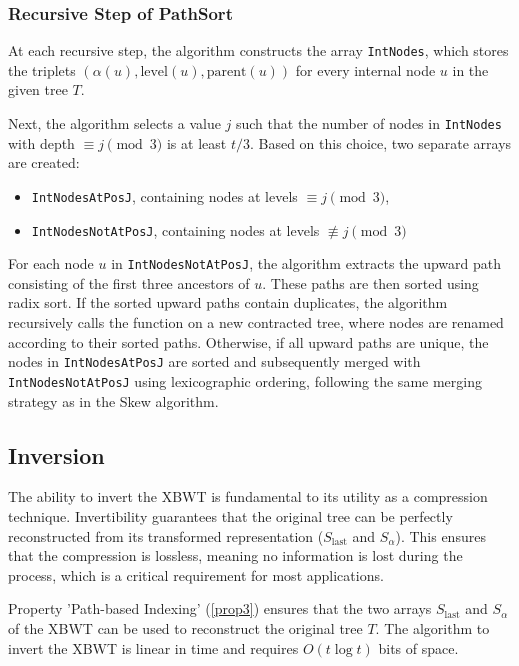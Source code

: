 \subsubsection{Recursive Step of PathSort}
At each recursive step, the algorithm constructs the array \texttt{IntNodes}, which stores the triplets $(\alpha(u), \text{level}(u), \text{parent}(u))$ for every internal node $u$ in the given tree $T$.  

Next, the algorithm selects a value $j$ such that the number of nodes in \texttt{IntNodes} with depth $\equiv j \pmod{3}$ is at least $t/3$. Based on this choice, two separate arrays are created:  
\begin{itemize}
    \item \texttt{IntNodesAtPosJ}, containing nodes at levels $\equiv j \pmod{3}$,
    \item \texttt{IntNodesNotAtPosJ}, containing nodes at levels $\not\equiv j \pmod{3}$
\end{itemize}

For each node $u$ in \texttt{IntNodesNotAtPosJ}, the algorithm extracts the upward path consisting of the first three ancestors of $u$. These paths are then sorted using radix sort. If the sorted upward paths contain duplicates, the algorithm recursively calls the {\pathsort} function on a new contracted tree, where nodes are renamed according to their sorted paths. Otherwise, if all upward paths are unique, the nodes in \texttt{IntNodesAtPosJ} are sorted and subsequently merged with \texttt{IntNodesNotAtPosJ} using lexicographic ordering, following the same merging strategy as in the Skew algorithm.

\subsection{Inversion}
The ability to invert the XBWT is fundamental to its utility as a compression technique. Invertibility guarantees that the original tree can be perfectly reconstructed from its transformed representation ($S_{\text{last}}$ and $S_{\alpha}$). This ensures that the compression is lossless, meaning no information is lost during the process, which is a critical requirement for most applications.

Property 'Path-based Indexing' (\cref{prop3}) ensures that the two arrays $S_{\text{last}}$ and $S_{\alpha}$ of the XBWT can be used to reconstruct the original tree $T$. The algorithm to invert the XBWT is linear in time and requires $O(t \log t)$ bits of space.

